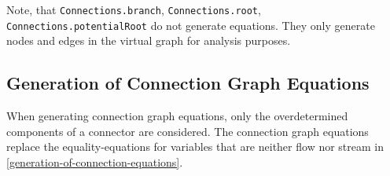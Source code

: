 \begin{nonnormative}
Note, that \lstinline!Connections.branch!, \lstinline!Connections.root!, \lstinline!Connections.potentialRoot! do not generate equations.
They only generate nodes and edges in the virtual graph for analysis purposes.
\end{nonnormative}


\subsection{Generation of Connection Graph Equations}\label{generation-of-connection-graph-equations}

When generating connection graph equations, only the overdetermined components of a connector are considered.
The connection graph equations replace the equality-equations for variables that are neither flow nor stream in \cref{generation-of-connection-equations}.

